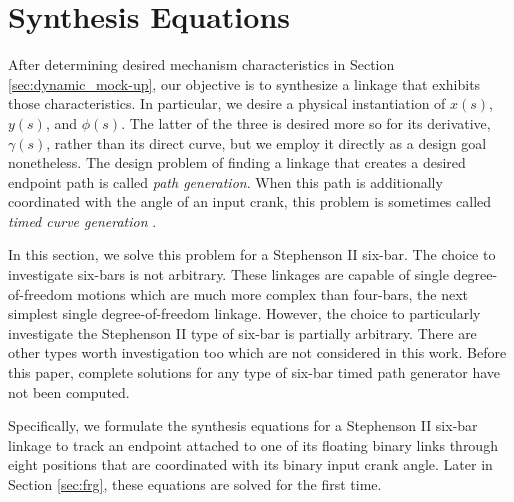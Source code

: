 \documentclass[journal]{IEEEtran}
\begin{document}
\section{Synthesis Equations}
\label{sec:synth_eq}

After determining desired mechanism characteristics in Section \ref{sec:dynamic_mock-up}, our objective is to synthesize a linkage that exhibits those characteristics.
In particular, we desire a physical instantiation of $x(s)$, $y(s)$, and $\phi(s)$.
The latter of the three is desired more so for its derivative, $\gamma(s)$, rather than its direct curve, but we employ it directly as a design goal nonetheless.
The design problem of finding a linkage that creates a desired endpoint path is called \emph{path generation}.
When this path is additionally coordinated with the angle of an input crank, this problem is sometimes called \emph{timed curve generation} \cite{dijksmanMotionGeometryMechanisms1976}.


In this section, we solve this problem for a Stephenson II six-bar.  The choice to investigate six-bars is not arbitrary.  These linkages are capable of single degree-of-freedom motions which are much more complex than four-bars, the next simplest single degree-of-freedom linkage.  However, the choice to particularly investigate the Stephenson II type of six-bar is partially arbitrary.  There are other types worth investigation too which are not considered in this work.  Before this paper, complete solutions for any type of six-bar timed path generator have not been computed.


Specifically, we formulate the synthesis equations for a Stephenson II six-bar linkage to track an endpoint attached to one of its floating binary links through eight positions that are coordinated with its binary input crank angle.
Later in Section \ref{sec:frg}, these equations are solved for the first time.
\end{document}

